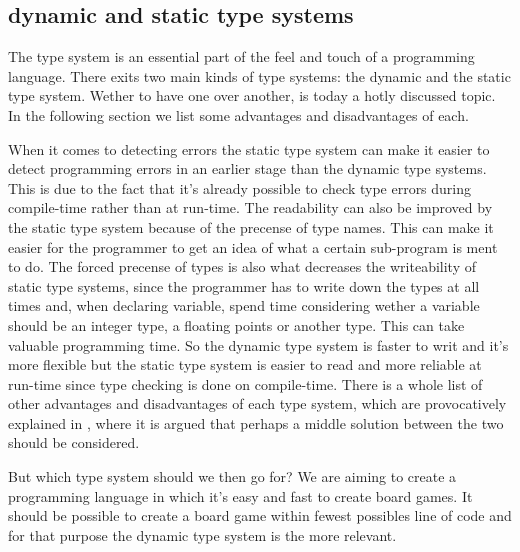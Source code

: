 \subsection{dynamic and static type systems}

The type system is an essential part of the feel and touch of a programming language. There exits two main kinds of type systems: the dynamic and the static type system. Wether to have one over another, is today a hotly discussed topic. In the following section we list some advantages and disadvantages of each. 

When it comes to detecting errors the static type system can make it easier to detect programming errors in an earlier stage than the dynamic type systems. This is due to the fact that it's already possible to check type errors during compile-time rather than at run-time. The readability can also be improved by the static type system because of the precense of type names. This can make it easier for the programmer to get an idea of what a certain sub-program is ment to do. The forced precense of types is also what decreases the writeability of static type systems, since the programmer has to write down the types at all times and, when declaring variable, spend time considering wether a variable should be an integer type, a floating points or another type. This can take valuable programming time. So the dynamic type system is faster to writ and it's more flexible but the static type system is easier to read and more reliable at run-time since type checking is done on compile-time. There is a whole list of other advantages and disadvantages of each type system, which are provocatively explained in \cite{staticvsdynamictypesystem}, where it is argued that perhaps a middle solution between the two should be considered.

But which type system should we then go for? We are aiming to create a programming language in which it's easy and fast to create board games. It should be possible to create a board game within fewest possibles line of code and for that purpose the dynamic type system is the more relevant. 